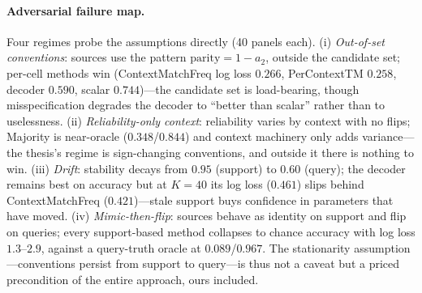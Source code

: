 \paragraph{Adversarial failure map.}
Four regimes probe the assumptions directly (40 panels each). (i)
\emph{Out-of-set conventions}: sources use the pattern
$\text{parity} = 1 - a_2$, outside the candidate set; per-cell
methods win (ContextMatchFreq log loss $0.266$, PerContextTM
$0.258$, decoder $0.590$, scalar $0.744$)---the candidate set is
load-bearing, though misspecification degrades the decoder to
``better than scalar'' rather than to uselessness. (ii)
\emph{Reliability-only context}: reliability varies by context with
no flips; Majority is near-oracle ($0.348$/$0.844$) and context
machinery only adds variance---the thesis's regime is sign-changing
conventions, and outside it there is nothing to win. (iii)
\emph{Drift}: stability decays from $0.95$ (support) to $0.60$
(query); the decoder remains best on accuracy but at $K{=}40$ its
log loss ($0.461$) slips behind ContextMatchFreq ($0.421$)---stale
support buys confidence in parameters that have moved. (iv)
\emph{Mimic-then-flip}: sources behave as identity on support and
flip on queries; every support-based method collapses to chance
accuracy with log loss $1.3$--$2.9$, against a query-truth oracle at
$0.089$/$0.967$. The stationarity assumption---conventions persist
from support to query---is thus not a caveat but a priced
precondition of the entire approach, ours included.
